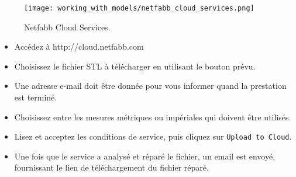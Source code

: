 \begin{figure}[H]
\centering
\texttt{[image: working\_with\_models/netfabb\_cloud\_services.png]}
\caption{Netfabb Cloud Services.}
\label{fig:netfabb_cloud_services}
\end{figure}

\begin{itemize}
	\item Acc\'edez \`a http://cloud.netfabb.com
	\item Choisissez le fichier STL \`a t\'el\'echarger en utilisant le bouton pr\'evu.
	\item Une adresse e-mail doit \^etre donn\'ee pour vous informer quand la prestation est termin\'e.
	\item Choisissez entre les mesures m\'etriques ou imp\'eriales qui doivent \^etre utilis\'es.
	\item Lisez et acceptez les conditions de service, puis cliquez sur \texttt{Upload to Cloud}.
	\item Une fois que le service a analys\'e et r\'epar\'e le fichier, un email est envoy\'e, fournissant le lien de t\'el\'echargement du fichier r\'epar\'e.
\end{itemize}
